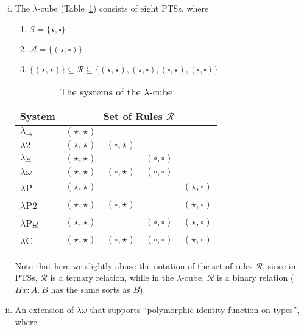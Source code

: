 \documentclass[oneside,a4paper]{article}
\numberwithin{equation}{section}
\renewcommand{\arraystretch}{2.5}
\begin{document}
\begin{enumerate}[(i)]

\item The $\lambda$-cube (Table~\ref{tab:lambda}) consists of eight
  PTSs, where

  \begin{enumerate}
  \item $\mathcal{S} = \{\star,\square\}$
  \item $\mathcal{A} = \{(\star, \square)\}$
  \item
    $\{(\star, \star)\} \subseteq \mathcal{R} \subseteq \{(\star,
    \star), (\star, \square), (\square, \star), (\square, \square)\}$
  \end{enumerate}


\begingroup
\renewcommand*{\arraystretch}{1.5}
\begin{table}[h!]
  \centering
  \begin{tabular}{|l|llll|}
    \hline
    System & \multicolumn{4}{|c|}{Set of Rules $\mathcal{R}$} \\ \hline
    $\lambda_{\rightarrow}$ & $(\star, \star)$ & & & \\
    $\lambda2$ & $(\star, \star)$ & $(\square, \star)$ & & \\ 
    $\lambda\underbar{$\omega$}$ & $(\star, \star)$ & &  $(\square, \square)$ & \\ 
    $\lambda\omega$ & $(\star, \star)$ & $(\square, \star)$ & $(\square, \square)$ & \\ 
    $\lambda$P & $(\star, \star)$ & & & $(\star, \square)$ \\ 
    $\lambda$P2 & $(\star, \star)$ & $(\square, \star)$ & & $(\star, \square)$ \\ 
    $\lambda$P$\underbar{$\omega$}$ & $(\star, \star)$ & & $(\square, \square)$ & $(\star, \square)$ \\ 
    $\lambda$C & $(\star, \star)$ & $(\square, \star)$ & $(\square, \square)$ & $(\star, \square)$ \\ \hline
  \end{tabular}
  \caption{The systems of the $\lambda$-cube}
  \label{tab:lambda}
\end{table}
\endgroup

Note that here we slightly abuse the notation of the set of rules
$\mathcal{R}$, since in PTSs, $\mathcal{R}$ is a ternary relation,
while in the $\lambda$-cube, $\mathcal{R}$ is a binary relation
($\Pi x: A.\ B$ has the same sorts as $B$).


\item An extension of $\lambda\omega$ that supports ``polymorphic
  identity function on types'', where


\end{enumerate}
\end{document}
